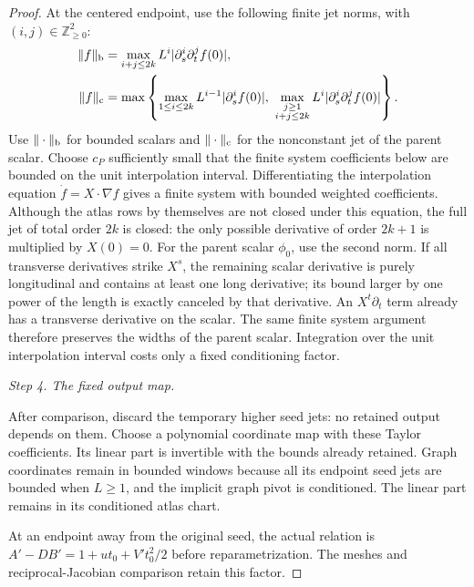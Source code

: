 \documentclass[11pt]{amsart}
\theoremstyle{definition}
\theoremstyle{remark}
\numberwithin{equation}{section}
\begin{document}
\begin{proof}
At the centered endpoint, use the following finite jet norms, with $(i,j)\in\mathbb Z_{\ge0}^2$:
\[
\begin{aligned}
\|f\|_{\rm b}&=\max_{i+j\le2k}L^i|\partial_s^i\partial_t^jf(0)|,\\
\|f\|_{\rm c}&=\max\left\{\max_{1\le i\le2k}L^{i-1}|\partial_s^if(0)|,\ \max_{\substack{j\ge1\\i+j\le2k}}L^i|\partial_s^i\partial_t^jf(0)|\right\}.
\end{aligned}
\]
Use $\|\cdot\|_{\rm b}$ for bounded scalars and $\|\cdot\|_{\rm c}$ for the nonconstant jet of the parent scalar. Choose $c_P$ sufficiently small that the finite system coefficients below are bounded on the unit interpolation interval. Differentiating the interpolation equation $\dot f=X\cdot\nabla f$ gives a finite system with bounded weighted coefficients. Although the atlas rows by themselves are not closed under this equation, the full jet of total order $2k$ is closed: the only possible derivative of order $2k+1$ is multiplied by $X(0)=0$. For the parent scalar $\phi_0$, use the second norm. If all transverse derivatives strike $X^s$, the remaining scalar derivative is purely longitudinal and contains at least one long derivative; its bound larger by one power of the length is exactly canceled by that derivative. An $X^t\partial_t$ term already has a transverse derivative on the scalar. The same finite system argument therefore preserves the widths of the parent scalar. Integration over the unit interpolation interval costs only a fixed conditioning factor.

\par\medskip\noindent\textit{Step 4. The fixed output map.}\par\nobreak\smallskip

After comparison, discard the temporary higher seed jets: no retained output depends on them. Choose a polynomial coordinate map with these Taylor coefficients. Its linear part is invertible with the bounds already retained. Graph coordinates remain in bounded windows because all its endpoint seed jets are bounded when $L\ge1$, and the implicit graph pivot is conditioned. The linear part remains in its conditioned atlas chart. 

At an endpoint away from the original seed, the actual relation is $A'-DB'=1+ut_0+V't_0^2/2$ before reparametrization. The meshes and reciprocal-Jacobian comparison retain this factor.
\end{proof}
\end{document}
